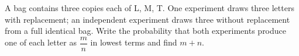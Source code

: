 A bag contains three copies each of L, M, T. One experiment draws three letters with replacement; an independent experiment draws three without replacement from a full identical bag. Write the probability that both experiments produce one of each letter as $\dfrac{m}{n}$ in lowest terms and find $m+n$.

